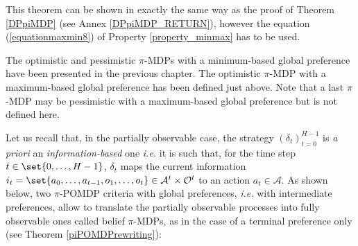 This theorem can be shown in exactly the same way as the proof of Theorem \ref{DPpiMDP}
(see Annex \ref{DPpiMDP_RETURN}),
however the equation (\ref{equationmaxmin8}) of Property \ref{property_minmax} has to be used.

The optimistic and pessimistic $\pi$-MDPs with a minimum-based global preference
have been presented in the previous chapter.
The optimistic $\pi$-MDP with a maximum-based global preference has been defined just above.
Note that a last $\pi$-MDP may be pessimistic with a maximum-based global preference
but is not defined here.

Let us recall that, in the partially observable case, 
the strategy $(\delta_t)_{t=0}^{H-1}$ 
is \textit{a priori} an \textit{information-based} one
\textit{i.e.} it is such that, for the time step $t \in \set{0,\ldots,H-1}$, 
$\delta_t$ maps the current information 
$i_t = \set{ a_0,\ldots,a_{t-1}, o_1, \ldots,o_t }
\in \mathcal{A}^t \times \mathcal{O}^t$
to an action $a_t \in \mathcal{A}$.
As shown below, two $\pi$-POMDP criteria with global preferences,
\textit{i.e.} with intermediate preferences, 
allow to translate the partially observable processes 
into fully observable ones called belief $\pi$-MDPs,
as in the case of a terminal preference only (see Theorem \ref{piPOMDPrewriting}):
